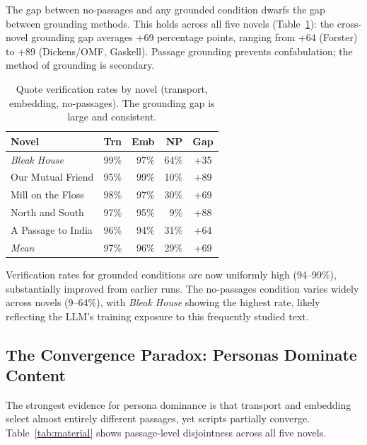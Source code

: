 \documentclass[final]{clv2025}
\begin{document}
The gap between no-passages and any grounded condition dwarfs the gap
between grounding methods.  This holds across all five novels
(Table~\ref{tab:quotes-xnovel}): the cross-novel grounding gap averages
+69 percentage points, ranging from +64 (Forster) to +89 (Dickens/OMF,
Gaskell).  Passage grounding prevents confabulation; the method of
grounding is secondary.

\begin{table}[t]
\caption{Quote verification rates by novel (transport, embedding,
  no-passages).  The grounding gap is large and consistent.}
\label{tab:quotes-xnovel}
\begin{tabular}{lrrrc}
\toprule
Novel & Trn & Emb & NP & Gap \\
\midrule
\textit{Bleak House}       & 99\% & 97\% & 64\% & +35 \\
Our Mutual Friend  & 95\% & 99\% &  10\% & +89 \\
Mill on the Floss  & 98\% & 97\% &  30\% & +69 \\
North and South    & 97\% & 95\% &  9\% & +88 \\
A Passage to India & 96\% & 94\% & 31\% & +64 \\
\midrule
\textit{Mean}      & 97\% & 96\% & 29\% & +69 \\
\bottomrule
\end{tabular}
\end{table}

Verification rates for grounded conditions are now uniformly high
(94--99\%), substantially improved from earlier runs.  The no-passages
condition varies widely across novels (9--64\%), with \textit{Bleak House}
showing the highest rate, likely reflecting the LLM's training exposure
to this frequently studied text.


\subsection{The Convergence Paradox: Personas Dominate Content}
\label{sec:material}

The strongest evidence for persona dominance is that transport and
embedding select almost entirely different passages, yet scripts
partially converge.  Table~\ref{tab:material} shows passage-level
disjointness across all five novels.
\end{document}

